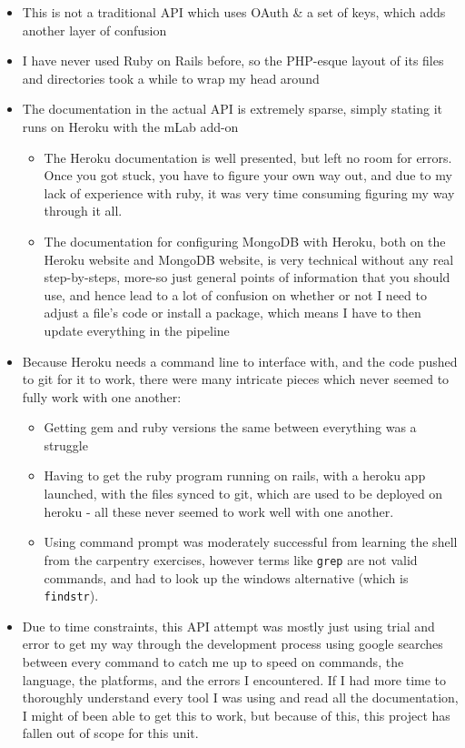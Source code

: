\documentclass{article}
\begin{document}
\begin{itemize}
    \item This is not a traditional API which uses OAuth \& a set of keys, which adds another layer of confusion
    \item I have never used Ruby on Rails before, so the PHP-esque layout of its files and directories took a while to wrap my head around
    \item The documentation in the actual API is extremely sparse, simply stating it runs on Heroku with the mLab add-on
    \begin{itemize}
        \item The Heroku documentation is well presented, but left no room for errors. Once you got stuck, you have to figure your own way out, and due to my lack of experience with ruby, it was very time consuming figuring my way through it all.
        \item The documentation for configuring MongoDB with Heroku, both on the Heroku website and MongoDB website, is very technical without any real step-by-steps, more-so just general points of information that you should use, and hence lead to a lot of confusion on whether or not I need to adjust a file's code or install a package, which means I have to then update everything in the pipeline
    \end{itemize}
    \item Because Heroku needs a command line to interface with, and the code pushed to git for it to work, there were many intricate pieces which never seemed to fully work with one another:
    \begin{itemize}
        \item Getting gem and ruby versions the same between everything was a struggle
        \item Having to get the ruby program running on rails, with a heroku app launched, with the files synced to git, which are used to be deployed on heroku - all these never seemed to work well with one another.
        \item Using command prompt was moderately successful from learning the shell from the carpentry exercises, however terms like \texttt{grep} are not valid commands, and had to look up the windows alternative (which is \texttt{findstr}).
    \end{itemize}
    \item Due to time constraints, this API attempt was mostly just using trial and error to get my way through the development process using google searches between every command to catch me up to speed on commands, the language, the platforms, and the errors I encountered. If I had more time to thoroughly understand every tool I was using and read all the documentation, I might of been able to get this to work, but because of this, this project has fallen out of scope for this unit.
\end{itemize}
\end{document}
